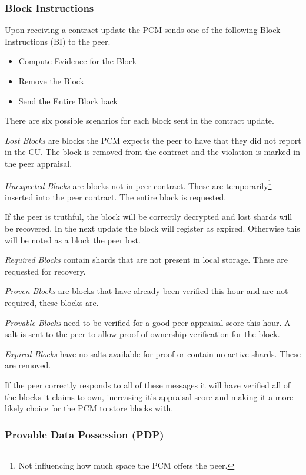 \documentclass[11pt, a4paper, twocolumn, twoside]{report}
\begin{document}
\subsubsection{Block Instructions}

Upon receiving a contract update the PCM sends one of the following Block Instructions (BI) to the peer.

\begin{itemize}
  \item Compute Evidence for the Block
  \item Remove the Block
  \item Send the Entire Block back
\end{itemize}

There are six possible scenarios for each block sent in the contract update.

\emph{Lost Blocks} are blocks the PCM expects the peer to have that they did not report in the CU. The block is removed from the contract and the violation is marked in the peer appraisal.

\emph{Unexpected Blocks} are blocks not in peer contract. These are temporarily\footnote{Not influencing how much space the PCM offers the peer.} inserted into the peer contract. The entire block is requested.

If the peer is truthful, the block will be correctly decrypted and lost shards will be recovered. In the next update the block will register as expired. Otherwise this will be noted as a block the peer lost.

\emph{Required Blocks} contain shards that are not present in local storage. These are requested for recovery.

\emph{Proven Blocks} are blocks that have already been verified this hour and are not required, these blocks are.

\emph{Provable Blocks} need to be verified for a good peer appraisal score this hour. A salt is sent to the peer to allow proof of ownership verification for the block.

\emph{Expired Blocks} have no salts available for proof or contain no active shards. These are removed.

If the peer correctly responds to all of these messages it will have verified all of the blocks it claims to own, increasing it's appraisal score and making it a more likely choice for the PCM to store blocks with.

\subsubsection{Provable Data Possession (PDP)}
\end{document}
